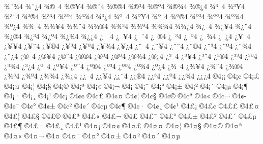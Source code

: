 {^^be^^a8^^be4
^^be^^a8^^bf4
^^be^^ae^^a04
^^be^^ae^^a54
^^be^^ae^^a84
^^be^^ae^^ae4
^^be^^ae^^b34
^^be^^ae^^ba4
^^be^^ae^^be4
^^be^^ae^^bf4
^^be^^b3^^a04
^^be^^b3^^a54
^^be^^b3^^a84
^^be^^b3^^ae4
^^be^^b3^^b34
^^be^^b3^^ba4
^^be^^b3^^be4
^^be^^b3^^bf4
^^be^^ba^^a04
^^be^^ba^^a54
^^be^^ba^^a84
^^be^^ba^^ae4
^^be^^ba^^b34
^^be^^ba^^ba4
^^be^^ba^^be4
^^be^^ba^^bf4
^^be^^be^^a04
^^be^^be^^a54
^^be^^be^^a84
^^be^^be^^ae4
^^be^^be^^b34
^^be^^be^^ba4
^^be^^be^^be4
^^be^^be^^bf4
^^be^^bf^^a04
^^be^^bf^^a54
^^be^^bf^^a84
^^be^^bf^^ae4
^^be^^bf^^b34
^^be^^bf^^ba4
^^be^^bf^^be4
^^be^^bf^^bf4
^^bf^^a0^^a04
^^bf^^a0^^a54
^^bf^^a0^^a84
^^bf^^a0^^ae4
^^bf^^a0^^b34
^^bf^^a0^^ba4
^^bf^^a0^^be4
^^bf^^a0^^bf4
^^bf^^a5^^a04
^^bf^^a5^^a54
^^bf^^a5^^a84
^^bf^^a5^^ae4
^^bf^^a5^^b34
^^bf^^a5^^ba4
^^bf^^a5^^be4
^^bf^^a5^^bf4
^^bf^^a8^^a04
^^bf^^a8^^a54
^^bf^^a8^^a84
^^bf^^a8^^ae4
^^bf^^a8^^b34
^^bf^^a8^^ba4
^^bf^^a8^^be4
^^bf^^a8^^bf4
^^bf^^ae^^a04
^^bf^^ae^^a54
^^bf^^ae^^a84
^^bf^^ae^^ae4
^^bf^^ae^^b34
^^bf^^ae^^ba4
^^bf^^ae^^be4
^^bf^^ae^^bf4
^^bf^^b3^^a04
^^bf^^b3^^a54
^^bf^^b3^^a84
^^bf^^b3^^ae4
^^bf^^b3^^b34
^^bf^^b3^^ba4
^^bf^^b3^^be4
^^bf^^b3^^bf4
^^bf^^ba^^a04
^^bf^^ba^^a54
^^bf^^ba^^a84
^^bf^^ba^^ae4
^^bf^^ba^^b34
^^bf^^ba^^ba4
^^bf^^ba^^be4
^^bf^^ba^^bf4
^^bf^^be^^a04
^^bf^^be^^a54
^^bf^^be^^a84
^^bf^^be^^ae4
^^bf^^be^^b34
^^bf^^be^^ba4
^^bf^^be^^be4
^^bf^^be^^bf4
^^bf^^bf^^a04
^^bf^^bf^^a54
^^bf^^bf^^a84
^^bf^^bf^^ae4
^^bf^^bf^^b34
^^bf^^bf^^ba4
^^bf^^bf^^be4
^^bf^^bf^^bf4
^^a94^^a1^^a1
^^a94^^a1^^a2
^^a94^^a1^^a3
^^a94^^a1^^a4
^^a94^^a1^^a6
^^a94^^a1^^a7
^^a94^^a1^^a9
^^a94^^a1^^aa
^^a94^^a1^^ab
^^a94^^a1^^ac
^^a94^^a1^^ad
^^a94^^a1^^af
^^a94^^a1^^b0
^^a94^^a1^^b1
^^a94^^a1^^b2
^^a94^^a1^^b4
^^a94^^a1^^b5
^^a94^^a1^^b6
^^a94^^a1^^b7
^^a94^^a1^^b8
^^a94^^a1^^b9
^^a94^^a2^^a1
^^a94^^a2^^a2
^^a94^^a2^^a3
^^a94^^a2^^a4
^^a94^^a2^^a6
^^a94^^a2^^a7
^^a94^^a2^^a9
^^a94^^a2^^aa
^^a94^^a2^^ab
^^a94^^a2^^ac
^^a94^^a2^^ad
^^a94^^a2^^af
^^a94^^a2^^b0
^^a94^^a2^^b1
^^a94^^a2^^b2
^^a94^^a2^^b4
^^a94^^a2^^b5
^^a94^^a2^^b6
^^a94^^a2^^b7
^^a94^^a2^^b8
^^a94^^a2^^b9
^^a94^^a3^^a1
^^a94^^a3^^a2
^^a94^^a3^^a3
^^a94^^a3^^a4
^^a94^^a3^^a6
^^a94^^a3^^a7
^^a94^^a3^^a9
^^a94^^a3^^aa
^^a94^^a3^^ab
^^a94^^a3^^ac
^^a94^^a3^^ad
^^a94^^a3^^af
^^a94^^a3^^b0
^^a94^^a3^^b1
^^a94^^a3^^b2
^^a94^^a3^^b4
^^a94^^a3^^b5
^^a94^^a3^^b6
^^a94^^a3^^b7
^^a94^^a3^^b8
^^a94^^a3^^b9
^^a94^^a4^^a1
^^a94^^a4^^a2
^^a94^^a4^^a3
^^a94^^a4^^a4
^^a94^^a4^^a6
^^a94^^a4^^a7
^^a94^^a4^^a9
^^a94^^a4^^aa
^^a94^^a4^^ab
^^a94^^a4^^ac
^^a94^^a4^^ad
^^a94^^a4^^af
^^a94^^a4^^b0
^^a94^^a4^^b1
^^a94^^a4^^b2
^^a94^^a4^^b4
^^a94^^a4^^b5
}
